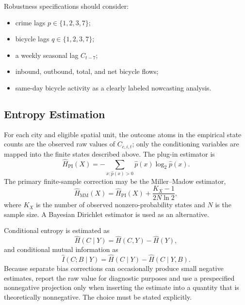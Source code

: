 \documentclass[applsci,article,submit,moreauthors]{Definitions/mdpi}
\begin{document}
Robustness specifications should consider:
\begin{itemize}
    \item crime lags $p\in\{1,2,3,7\}$;
    \item bicycle lags $q\in\{1,2,3,7\}$;
    \item a weekly seasonal lag $C_{t-7}$;
    \item inbound, outbound, total, and net bicycle flows;
    \item same-day bicycle activity as a clearly labeled nowcasting analysis.
\end{itemize}

\subsection{Entropy Estimation}
\label{subsec:entropy_estimation}

For each city and eligible spatial unit, the outcome atoms in the empirical
state counts are the observed raw values of \(C_{c,i,t}\); only the
conditioning variables are mapped into the finite states described above.
The plug-in estimator is
\begin{equation}
\widehat{H}_{\mathrm{PI}}(X)
=-\sum_{x:\widehat{p}(x)>0}\widehat{p}(x)\log_2\widehat{p}(x).
\end{equation}
The primary finite-sample correction may be the Miller--Madow estimator,
\begin{equation}
\widehat{H}_{\mathrm{MM}}(X)
=
\widehat{H}_{\mathrm{PI}}(X)
+
\frac{K_X-1}{2N\ln 2},
\label{eq:miller_madow}
\end{equation}
where $K_X$ is the number of observed nonzero-probability states and $N$ is the sample size. A Bayesian Dirichlet estimator is used as an alternative.

Conditional entropy is estimated as
\begin{equation}
\widehat{H}(C\mid Y)
=
\widehat{H}(C,Y)-\widehat{H}(Y),
\end{equation}
and conditional mutual information as
\begin{equation}
\widehat{I}(C;B\mid Y)
=
\widehat{H}(C\mid Y)-\widehat{H}(C\mid Y,B).
\label{eq:estimated_cmi}
\end{equation}
Because separate bias corrections can occasionally produce small negative estimates, report the raw value for diagnostic purposes and use a prespecified nonnegative projection only when inserting the estimate into a quantity that is theoretically nonnegative. The choice must be stated explicitly.
\end{document}
